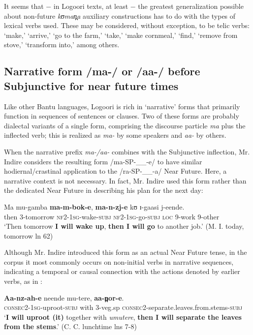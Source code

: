 \documentclass[output=paper]{langsci/langscibook}
\begin{document}
It seems that $-$ in Logoori texts, at least $-$ the greatest generalization possible about non-future \textit{kʊman̪a} auxiliary constructions has to do with the types of lexical verbs used. These may be considered, without exception, to be telic verbs: ‘make,’ ‘arrive,’ ‘go to the farm,’ ‘take,’ ‘make cornmeal,’ ‘find,’ ‘remove from stove,’ ‘transform into,’ among others.

\subsection{Narrative form /ma-/ or /aa-/ before Subjunctive for near future times} \label{sec:sarvasy:7.4}

Like other Bantu languages, Logoori is rich in ‘narrative’ %
%
forms that primarily function in sequences of sentences or clauses. Two of these forms are probably dialectal variants of a single form, comprising the discourse particle \textit{ma} plus the inflected verb; this is realized as \textit{ma-} by some speakers and \textit{aa-} by others.

When the narrative prefix \textit{ma-/aa-} combines with the Subjunctive inflection, Mr. Indire considers the resulting form /ma-SP-\_\_-e/ to have similar hodiernal/crastinal application to the /ra-SP-\_\_-a/ Near Future. Here, a narrative context is not necessary. In fact, Mr. Indire used this form rather than the dedicated Near Future in describing his plan for the next day:

\ea\label{ex:sarvasy:28}
\gll Ma   mu-gamba   \textbf{ma-m-bok-e},     \textbf{ma-n-zj-e}     kʊ   ɪ-gaasi   j-eende. \\
then   3-tomorrow   \textsc{nf2}-\textsc{1sg}-wake-\textsc{subj}  \textsc{nf2}-\textsc{1sg}-go-\textsc{subj}  \textsc{loc}  9-work  9-other \\
\glt ‘Then tomorrow \textbf{I will wake up}, \textbf{then I will go} to another job.’ (M. I. today, tomorrow ln 62)
\z

Although Mr. Indire introduced this form as an actual Near Future tense, in the corpus it most commonly occurs on non-initial verbs in narrative sequences, indicating a temporal or causal connection with the actions denoted by earlier verbs, as in : 

\ea\label{ex:sarvasy:29}
\gll \textbf{Aa-nz-ah-e}       neende   mu-tere,  \textbf{aa-n̪or-e}.\\
\textsc{consec2}-\textsc{1sg}-uproot-\textsc{subj}  with  3-veg.sp  \textsc{consec2}-separate.leaves.from.stems-\textsc{subj} \\
\glt ‘\textbf{I will uproot (it)} together with \textit{umutere}, \textbf{then I will separate the leaves from the stems}.’ (C. C. lunchtime lns 7-8)
\z
\end{document}
